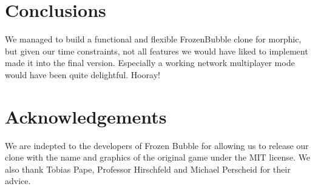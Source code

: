 \section{Conclusions}
We managed to build a functional and flexible FrozenBubble clone for morphic,
but given our time constraints, not all features we would have liked to implement
made it into the final version. Especially a working network multiplayer mode would
have been quite delightful.
Hooray!

\section*{Acknowledgements}
We are indepted to the developers of Frozen Bubble for allowing us to release 
our clone with the name and graphics of the original game under the MIT 
license. We also thank Tobias Pape, Professor Hirschfeld and Michael Perscheid for 
their advice.
